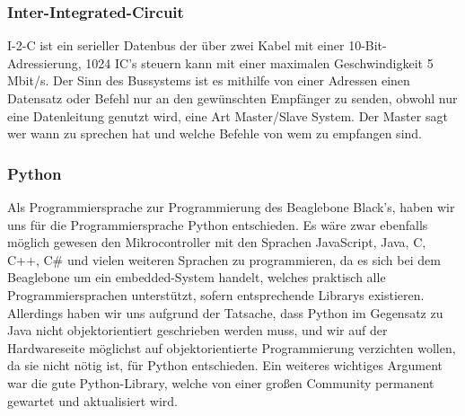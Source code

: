 \subsubsection{Inter-Integrated-Circuit}
I-2-C ist ein serieller Datenbus der über zwei Kabel mit einer 10-Bit-Adressierung, 1024 IC's steuern kann mit einer maximalen Geschwindigkeit 5 Mbit/s. Der Sinn des Bussystems ist es mithilfe von einer Adressen einen Datensatz oder Befehl nur an den gewünschten Empfänger zu senden, obwohl nur eine Datenleitung genutzt wird, eine Art Master/Slave System. Der Master sagt wer wann zu sprechen hat und welche Befehle von wem zu empfangen sind.

\subsubsection{Python}
Als Programmiersprache zur Programmierung des Beaglebone Black’s, haben wir uns für die Programmiersprache Python entschieden. Es wäre zwar ebenfalls möglich gewesen den Mikrocontroller mit den Sprachen JavaScript, Java, C, C++, C\# und vielen weiteren Sprachen zu programmieren, da es sich bei dem Beaglebone um ein embedded-System handelt, welches praktisch alle Programmiersprachen unterstützt, sofern entsprechende Librarys existieren. Allerdings haben wir uns aufgrund der Tatsache, dass Python im Gegensatz zu Java nicht objektorientiert geschrieben werden muss, und wir auf der Hardwareseite möglichst auf objektorientierte Programmierung verzichten wollen, da sie nicht nötig ist, für Python entschieden. Ein weiteres wichtiges Argument war die gute Python-Library, welche von einer großen Community permanent gewartet und aktualisiert wird.

